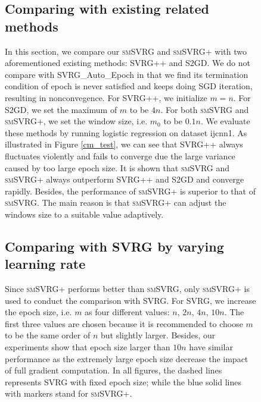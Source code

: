 \documentclass[conference]{IEEEtran}
\begin{document}
\begin{itemize}
\begin{figure}[ht]
\subsection{Comparing with existing related methods}
In this section, we compare our \textsc{smSVRG} and \textsc{smSVRG+} with two aforementioned existing methods: SVRG++ and S2GD. We do not compare with SVRG\_Auto\_Epoch in that we find its termination condition of epoch is never satisfied and keeps doing SGD iteration, resulting in nonconvegence. For SVRG++, we initialize $m = n$. For S2GD, we set the maximum of $m$ to be $4n$. For both \textsc{smSVRG} and \textsc{smSVRG+}, we set the window size, i.e. $m_0$ to be $0.1n$. We evaluate these methods by running logistic regression on dataset ijcnn1. 
As illustrated in Figure \ref{cm_test}, we can see that SVRG++ always fluctuates violently and fails to converge due the large variance caused by too large epoch size. It is shown that \textsc{smSVRG} and \textsc{smSVRG+} always outperform SVRG++ and S2GD and converge rapidly. Besides, the performance of \textsc{smSVRG+} is superior to that of \textsc{smSVRG}. The main reason is that \textsc{smSVRG+} can adjust the windows size to a suitable value adaptively.

 \subsection{Comparing with SVRG by varying learning rate}
Since \textsc{smSVRG+} performs better than \textsc{smSVRG}, only \textsc{smSVRG+} is used to conduct the comparison with SVRG. For SVRG, we increase the epoch size, i.e. $m$ as four different values: $n$, $2n$, $4n$, $10n$. The first three values are chosen because it is recommended to choose $m$ to be the same order of $n$ but slightly larger\citep{Johnson:9MAvkbgy}. Besides, our experiments show that epoch size larger than $10n$ have similar performance as the extremely large epoch size decrease the impact of full gradient computation. In all figures, the dashed lines represents SVRG with fixed epoch size; while the blue solid lines with markers stand for \textsc{smSVRG+}.


\end{figure}
\end{itemize}
\end{document}
